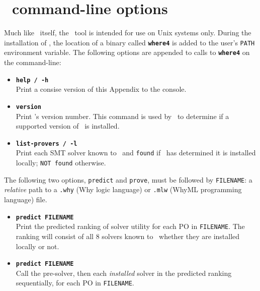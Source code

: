 \chapter{\where~command-line options} %
\thispagestyle{nohead}
\label{App:command} %

Much like \why~itself, the \where~tool is intended for use on Unix systems only. 
During the installation of \where, the location of a binary called \texttt{\textbf{where4}} is added to the user's \texttt{PATH} environment variable. 
The following options are appended to calls to \texttt{\textbf{where4}} on the command-line:

\begin{itemize}[leftmargin=*]
	\item[] \textbf{\texttt{\textendash\textendash help / -h}} \\ Print a consise version of this Appendix to the console.
	\item[] \textbf{\texttt{\textendash\textendash version}} \\ Print \where's version number. This command is used by \why~to determine if a supported version of \where~is installed.
	\item[] \textbf{\texttt{\textendash\textendash list-provers / -l}} \\ Print each SMT solver known to \where~and \texttt{found} if \where~has determined it is installed locally; \texttt{NOT found} otherwise.	
\end{itemize}

The following two options, \texttt{predict} and \texttt{prove}, must be followed by \texttt{FILENAME}: a \textit{relative} path to a \texttt{.why} (Why logic language) or \texttt{.mlw} (WhyML programming language) file.

\begin{itemize}[leftmargin=*]
	\item[]\textbf{\texttt{predict FILENAME}}\\ Print the predicted ranking of solver utility for each PO in \texttt{FILENAME}. The ranking will consist of all 8 solvers known to \where~whether they are installed locally or not.
	\item[]\textbf{\texttt{predict FILENAME}}\\ Call the pre-solver, then each \textit{installed} solver in the predicted ranking sequentially, for each PO in \texttt{FILENAME}.
\end{itemize}


